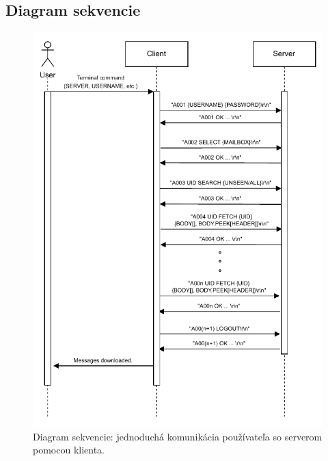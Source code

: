 \documentclass[a4paper, 11pt]{article}
\begin{document}
	\subsection{Diagram sekvencie}
	\label{subsection:sequence}
	\begin{figure}[!ht]
		\centering
		\vspace{1cm}
		\includegraphics[width=0.9\linewidth]{res/diagram_sequence.pdf}
		\caption{Diagram sekvencie: jednoduchá komunikácia používateľa so serverom pomocou klienta.}
		\label{figure:sequence}
	\end{figure}
\end{document}

